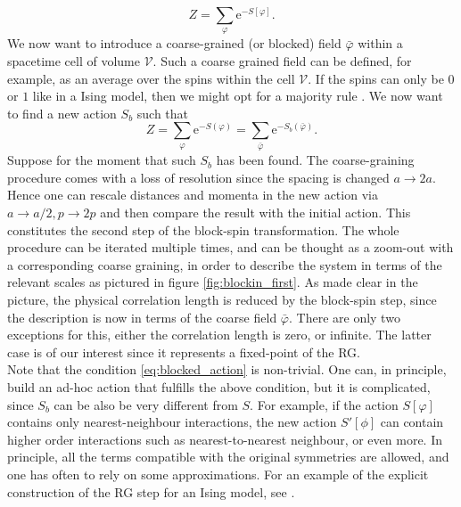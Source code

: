\begin{equation*}
    Z=\sum_{\varphi} \mathrm{e}^{-S[\varphi]}.
\end{equation*}
We now want to introduce a coarse-grained (or blocked) field $\bar\varphi$ within a spacetime cell of volume $\mathcal{V}$. Such a coarse grained field can be defined, for example, as an average over the spins within the cell $\mathcal{V}$. If the spins can only be $0$ or $1$ like in a Ising model, then we might opt for a majority rule \cite{cardy_1996}.
We now want to find a new action $S_b$ such that 
\begin{equation}
    Z=\sum_{\varphi} \mathrm{e}^{-S(\varphi)}= \sum_{\bar\varphi} \mathrm{e}^{-S_b\left(\bar\varphi\right)}.
    \label{eq:blocked_action}
\end{equation}
Suppose for the moment that such $S_b$ has been found. The coarse-graining procedure comes with a loss of resolution since the spacing is changed $a \to 2a$. Hence one can rescale distances and momenta in the new action via $a \to a/2, p \to 2p$ and then compare the result with the initial action. This constitutes the second step of the block-spin transformation. The whole procedure can be iterated multiple times, and can be thought as a zoom-out with a corresponding coarse graining, in order to describe the system in terms of the relevant scales as pictured in figure \ref{fig:blockin_first}. As made clear in the picture, the physical correlation length is reduced by the block-spin step, since the description is now in terms of the coarse field $\bar\varphi$. 
There are only two exceptions for this, either the correlation length is zero, or infinite. The latter case is of our interest since it represents a fixed-point of the RG. \\
Note that the condition \eqref{eq:blocked_action} is non-trivial. One can, in principle, build an ad-hoc action that fulfills the above condition, but it is complicated, since $S_b$ can be also be very different from $S$. For example, if the action $S[\varphi]$ contains only nearest-neighbour interactions, the new action $S'[\phi]$ can contain higher order interactions such as nearest-to-nearest neighbour, or even more.  In principle, all the terms compatible with the original symmetries are allowed, and one has often to rely on some approximations. For an example of the explicit construction of the RG step for an Ising model, see \cite{cardy_1996}. \\

